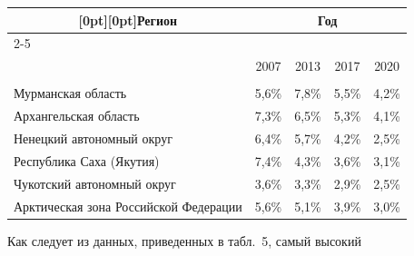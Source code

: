 \begin{table}\small


\begin{center}




\vspace*{2ex}





\begin{tabular}{|l|c|c|c|c|}


\hline


\multicolumn{1}{|c|}{\raisebox{-6pt}[0pt][0pt]{Регион}}&


\multicolumn{4}{c|}{Год}\\[3pt]


\cline{2-5}


&&&&\\[-9pt]


&2007&2013&2017&2020\\


\hline


&&&&\\[-9pt]


Мурманская область&5,6\%&7,8\%&5,5\%&4,2\%\\


Архангельская область&7,3\%&6,5\%&5,3\%&4,1\%\\


Ненецкий автономный округ&6,4\%&5,7\%&4,2\%&2,5\%\\


Республика Саха (Якутия) &7,4\%&4,3\%&3,6\%&3,1\%\\


Чукотский автономный округ&3,6\%&3,3\%&2,9\%&2,5\%\\


Арктическая зона Российской Федерации&5,6\%&5,1\%&3,9\%&3,0\%\\


\hline


\end{tabular}


\end{center}


\vspace*{-12pt}


\end{table}





    Как следует из данных, приведенных в табл.~5, самый высокий


